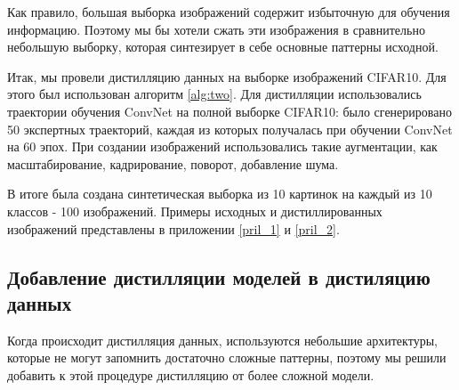 \documentclass[12pt]{article}
\begin{document}

Как правило, большая выборка изображений содержит избыточную для обучения информацию. Поэтому мы бы хотели сжать эти изображения в сравнительно небольшую выборку, которая синтезирует в себе основные паттерны исходной.

Итак, мы провели дистилляцию данных на выборке изображений CIFAR10. Для этого был использован алгоритм \ref{alg:two}. Для дистилляции использовались траектории обучения ConvNet на полной выборке CIFAR10: было сгенерировано 50 экспертных траекторий, каждая из которых получалась при обучении ConvNet на 60 эпох. При создании изображений использовались такие аугментации, как масштабирование, кадрирование, поворот, добавление шума.

В итоге была создана синтетическая выборка из 10 картинок на каждый из 10 классов - 100 изображений. Примеры исходных и дистиллированных изображений представлены в приложении \ref{pril_1} и \ref{pril_2}.





 


\subsection{Добавление дистилляции моделей в дистиляцию данных}\label{43}

Когда происходит дистилляция данных, используются небольшие архитектуры, которые не могут запомнить достаточно сложные паттерны, поэтому мы решили добавить к этой процедуре дистилляцию от более сложной модели.
\end{document}
